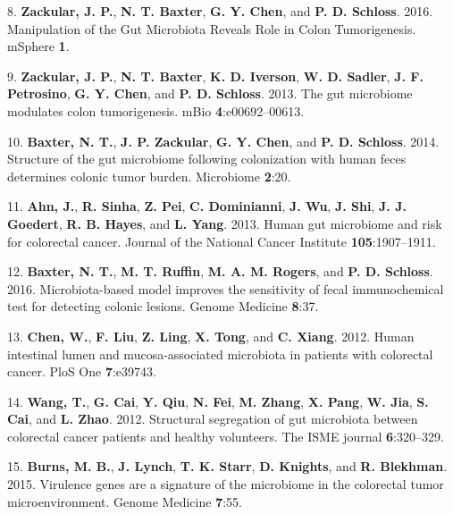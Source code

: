 \documentclass[12pt,]{article}
\begin{document}
\hypertarget{ref-zackular_manipulation_2016}{}
8. \textbf{Zackular, J. P.}, \textbf{N. T. Baxter}, \textbf{G. Y. Chen},
and \textbf{P. D. Schloss}. 2016. Manipulation of the Gut Microbiota
Reveals Role in Colon Tumorigenesis. mSphere \textbf{1}.

\hypertarget{ref-zackular_gut_2013}{}
9. \textbf{Zackular, J. P.}, \textbf{N. T. Baxter}, \textbf{K. D.
Iverson}, \textbf{W. D. Sadler}, \textbf{J. F. Petrosino}, \textbf{G. Y.
Chen}, and \textbf{P. D. Schloss}. 2013. The gut microbiome modulates
colon tumorigenesis. mBio \textbf{4}:e00692--00613.

\hypertarget{ref-baxter_structure_2014}{}
10. \textbf{Baxter, N. T.}, \textbf{J. P. Zackular}, \textbf{G. Y.
Chen}, and \textbf{P. D. Schloss}. 2014. Structure of the gut microbiome
following colonization with human feces determines colonic tumor burden.
Microbiome \textbf{2}:20.

\hypertarget{ref-ahn_human_2013}{}
11. \textbf{Ahn, J.}, \textbf{R. Sinha}, \textbf{Z. Pei}, \textbf{C.
Dominianni}, \textbf{J. Wu}, \textbf{J. Shi}, \textbf{J. J. Goedert},
\textbf{R. B. Hayes}, and \textbf{L. Yang}. 2013. Human gut microbiome
and risk for colorectal cancer. Journal of the National Cancer Institute
\textbf{105}:1907--1911.

\hypertarget{ref-baxter_microbiota-based_2016}{}
12. \textbf{Baxter, N. T.}, \textbf{M. T. Ruffin}, \textbf{M. A. M.
Rogers}, and \textbf{P. D. Schloss}. 2016. Microbiota-based model
improves the sensitivity of fecal immunochemical test for detecting
colonic lesions. Genome Medicine \textbf{8}:37.

\hypertarget{ref-chen_human_2012}{}
13. \textbf{Chen, W.}, \textbf{F. Liu}, \textbf{Z. Ling}, \textbf{X.
Tong}, and \textbf{C. Xiang}. 2012. Human intestinal lumen and
mucosa-associated microbiota in patients with colorectal cancer. PloS
One \textbf{7}:e39743.

\hypertarget{ref-wang_structural_2012}{}
14. \textbf{Wang, T.}, \textbf{G. Cai}, \textbf{Y. Qiu}, \textbf{N.
Fei}, \textbf{M. Zhang}, \textbf{X. Pang}, \textbf{W. Jia}, \textbf{S.
Cai}, and \textbf{L. Zhao}. 2012. Structural segregation of gut
microbiota between colorectal cancer patients and healthy volunteers.
The ISME journal \textbf{6}:320--329.

\hypertarget{ref-burns_virulence_2015}{}
15. \textbf{Burns, M. B.}, \textbf{J. Lynch}, \textbf{T. K. Starr},
\textbf{D. Knights}, and \textbf{R. Blekhman}. 2015. Virulence genes are
a signature of the microbiome in the colorectal tumor microenvironment.
Genome Medicine \textbf{7}:55.
\end{document}
